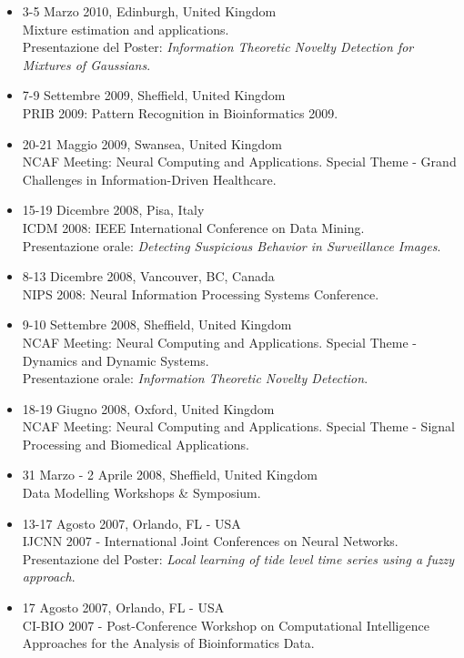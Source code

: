 \documentclass[a4paper,10pt]{article}
\begin{document}
\begin{itemize}
\item 3-5 Marzo 2010, Edinburgh, United Kingdom \\
  Mixture estimation and applications.
  \\Presentazione del Poster: \emph{Information Theoretic Novelty Detection for Mixtures of Gaussians}.
\item 7-9 Settembre 2009, Sheffield, United Kingdom \\
  PRIB 2009: Pattern Recognition in Bioinformatics 2009.
\item 20-21 Maggio 2009, Swansea, United Kingdom \\
  NCAF Meeting: Neural Computing and Applications. Special Theme - Grand Challenges in Information-Driven Healthcare.
\item 15-19 Dicembre 2008, Pisa, Italy \\
  ICDM 2008: IEEE International Conference on Data Mining.
  \\Presentazione orale: \emph{Detecting Suspicious Behavior in Surveillance Images}.
\item 8-13 Dicembre 2008, Vancouver, BC, Canada \\
  NIPS 2008: Neural Information Processing Systems Conference.
\item 9-10 Settembre 2008, Sheffield, United Kingdom \\
  NCAF Meeting: Neural Computing and Applications. Special Theme - Dynamics and Dynamic Systems.
  \\Presentazione orale: \emph{Information Theoretic Novelty Detection}.
\item 18-19 Giugno 2008, Oxford, United Kingdom \\
  NCAF Meeting: Neural Computing and Applications. Special Theme - Signal Processing and Biomedical Applications.
\item 31 Marzo - 2 Aprile 2008, Sheffield, United Kingdom \\
  Data Modelling Workshops \& Symposium.
\item 13-17 Agosto 2007, Orlando, FL - USA \\
  IJCNN 2007 - International Joint Conferences on Neural Networks.
  \\Presentazione del Poster: \emph{Local learning of tide level time series using a fuzzy approach}.
\item 17 Agosto 2007, Orlando, FL - USA \\
  CI-BIO 2007 - Post-Conference Workshop on Computational Intelligence Approaches for the Analysis of Bioinformatics Data.

\end{itemize}
\end{document}
